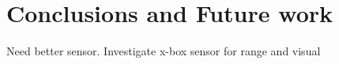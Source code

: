 \documentclass[conference]{IEEEtran}
\begin{document}
\section{Conclusions and Future work}
Need better sensor. Investigate x-box sensor for range and visual


%
%



%
%
\end{document}
